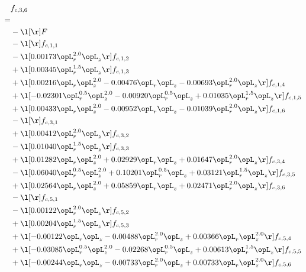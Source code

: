 \begin{alignat}{2} 
\label{eq:f_36_1} 
& f_{c,3,6} \nonumber \\ 
 = \\ 
& - \l[  \r] F \nonumber \\ 
& - \l[  \r] f_{c,1,1} \nonumber \\ 
& - \l[  0.00173 \opL_r^{2.0} \opL_z  \r] f_{c,1,2} \nonumber \\ 
& + \l[  0.00345 \opL_r^{1.5} \opL_z  \r] f_{c,1,3} \nonumber \\ 
& + \l[  0.00216 \opL_r \opL_z^{2.0}   -0.00476 \opL_r \opL_z   -0.00693 \opL_r^{2.0} \opL_z  \r] f_{c,1,4} \nonumber \\ 
& + \l[  -0.02301 \opL_r^{0.5} \opL_z^{2.0}   -0.00920 \opL_r^{0.5} \opL_z +  0.01035 \opL_r^{1.5} \opL_z  \r] f_{c,1,5} \nonumber \\ 
& + \l[  0.00433 \opL_r \opL_z^{2.0}   -0.00952 \opL_r \opL_z   -0.01039 \opL_r^{2.0} \opL_z  \r] f_{c,1,6} \nonumber \\ 
& - \l[  \r] f_{c,3,1} \nonumber \\ 
& + \l[  0.00412 \opL_r^{2.0} \opL_z  \r] f_{c,3,2} \nonumber \\ 
& - \l[  0.01040 \opL_r^{1.5} \opL_z  \r] f_{c,3,3} \nonumber \\ 
& + \l[  0.01282 \opL_r \opL_z^{2.0} +  0.02929 \opL_r \opL_z +  0.01647 \opL_r^{2.0} \opL_z  \r] f_{c,3,4} \nonumber \\ 
& - \l[  0.06040 \opL_r^{0.5} \opL_z^{2.0} +  0.10201 \opL_r^{0.5} \opL_z +  0.03121 \opL_r^{1.5} \opL_z  \r] f_{c,3,5} \nonumber \\ 
& + \l[  0.02564 \opL_r \opL_z^{2.0} +  0.05859 \opL_r \opL_z +  0.02471 \opL_r^{2.0} \opL_z  \r] f_{c,3,6} \nonumber \\ 
& - \l[  \r] f_{c,5,1} \nonumber \\ 
& - \l[  0.00122 \opL_r^{2.0} \opL_z  \r] f_{c,5,2} \nonumber \\ 
& + \l[  0.00204 \opL_r^{1.5} \opL_z  \r] f_{c,5,3} \nonumber \\ 
& + \l[  -0.00122 \opL_r \opL_z   -0.00488 \opL_r^{2.0} \opL_z +  0.00366 \opL_r \opL_z^{2.0}  \r] f_{c,5,4} \nonumber \\ 
& + \l[  -0.03085 \opL_r^{0.5} \opL_z^{2.0}   -0.02268 \opL_r^{0.5} \opL_z +  0.00613 \opL_r^{1.5} \opL_z  \r] f_{c,5,5} \nonumber \\ 
& + \l[  -0.00244 \opL_r \opL_z   -0.00733 \opL_r^{2.0} \opL_z +  0.00733 \opL_r \opL_z^{2.0}  \r] f_{c,5,6} \nonumber \\ 

\end{alignat}
